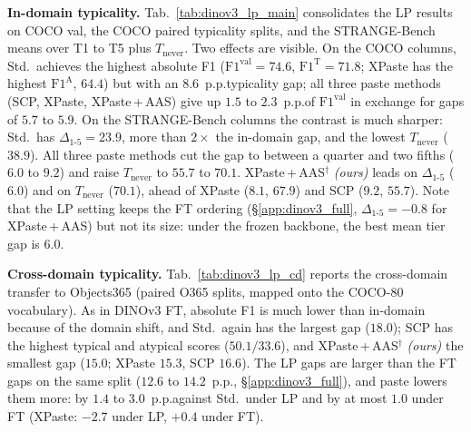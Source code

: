 \noindent\textbf{In-domain typicality.}
Tab.~\ref{tab:dinov3_lp_main} consolidates the LP results on COCO val, the COCO paired typicality splits, and the STRANGE-Bench means over T1 to T5 plus $T_{\text{never}}$. Two effects are visible. On the COCO columns, Std.\ achieves the highest absolute F1 ($\text{F1}^{\text{val}} = 74.6$, $\text{F1}^{\text{T}} = 71.8$; XPaste has the highest $\text{F1}^{\text{A}}$, $64.4$) but with an $8.6$~p.p.\@ typicality gap; all three paste methods (SCP, XPaste, XPaste\,+\,AAS) give up $1.5$ to $2.3$~p.p.\@ of $\text{F1}^{\text{val}}$ in exchange for gaps of $5.7$ to $5.9$. On the STRANGE-Bench columns the contrast is much sharper: Std.\ has $\Delta_{1\text{-}5} = 23.9$, more than $2\times$ the in-domain gap, and the lowest $T_{\text{never}}$ ($38.9$). All three paste methods cut the gap to between a quarter and two fifths ($6.0$ to $9.2$) and raise $T_{\text{never}}$ to $55.7$ to $70.1$. XPaste\,+\,AAS$^{\dagger}$ \emph{(ours)} leads on $\Delta_{1\text{-}5}$ ($6.0$) and on $T_{\text{never}}$ ($70.1$), ahead of XPaste ($8.1$, $67.9$) and SCP ($9.2$, $55.7$). Note that the LP setting keeps the FT ordering (\S\ref{app:dinov3_full}, $\Delta_{1\text{-}5} = -0.8$ for XPaste\,+\,AAS) but not its size: under the frozen backbone, the best mean tier gap is $6.0$.

\begin{table}[!htp]%
\centering
\footnotesize
\setlength{\tabcolsep}{4pt}
\caption{\textbf{DINOv3 ViT-B/16 linear probe: cross-domain
(Objects365) typicality.} XPaste\,+\,AAS$^{\dagger}$ \emph{(ours)} has the smallest gap ($15.0$ against $18.0$ for Std.) and SCP the highest typical and atypical F1. F1$_{\text{micro}}$ (\%) on the Objects365 val quintile paired split ranked by COCO \texttt{train2017} NPMI (the Objects365-NPMI split of Tab.~\ref{tab:dinov3_ft_cd} was not evaluated for the probe); COCO columns as in Tab.~\ref{tab:dinov3_lp_main}. Best per column in \textbf{bold}, second-best~\underline{underlined}.}
\label{tab:dinov3_lp_cd}

\end{table}

\noindent\textbf{Cross-domain typicality.}
Tab.~\ref{tab:dinov3_lp_cd} reports the cross-domain transfer to
Objects365 (paired O365 splits, mapped onto the COCO-80 vocabulary).
As in DINOv3 FT, absolute F1 is much lower than in-domain because
of the domain shift, and Std.\ again has the largest gap ($18.0$); SCP has the highest typical and atypical scores ($50.1 / 33.6$), and XPaste\,+\,AAS$^{\dagger}$ \emph{(ours)} the smallest gap ($15.0$; XPaste $15.3$, SCP $16.6$). The LP gaps are larger than the FT gaps on the same split ($12.6$ to $14.2$~p.p.\@, \S\ref{app:dinov3_full}), and paste lowers them more: by $1.4$ to $3.0$~p.p.\@ against Std.\ under LP and by at most $1.0$ under FT (XPaste: $-2.7$ under LP, $+0.4$ under FT).

